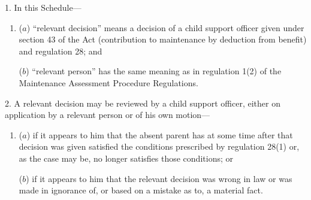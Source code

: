 \documentclass[12pt,a4paper]{article}
\begin{document}
\renewcommand\parthead{--- Schedule 5}

\medskip

1.  In this Schedule—
\begin{enumerate}\item[]
($a$) “relevant decision” means a decision of a child support officer given under section 43 of the Act (contribution to maintenance by deduction from benefit) and regulation 28; and

($b$) “relevant person” has the same meaning as in regulation 1(2) of the Maintenance Assessment Procedure Regulations.
\end{enumerate}


\medskip


2.  A relevant decision may be reviewed by a child support officer, either on application by a relevant person or of his own motion—
\begin{enumerate}\item[]
($a$) if it appears to him that the absent parent has at some time after that decision was given satisfied the conditions prescribed by regulation 28(1) or, as the case may be, no longer satisfies those conditions; or

($b$) if it appears to him that the relevant decision was wrong in law or was made in ignorance of, or based on a mistake as to, a material fact.
\end{enumerate}

\end{document}
